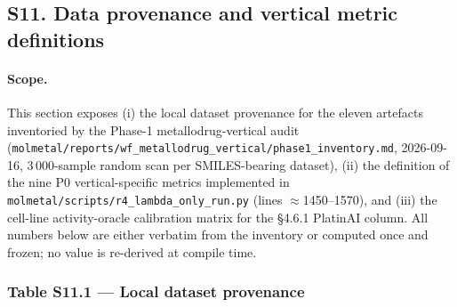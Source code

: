 %
%

\subsection*{S11. Data provenance and vertical metric definitions}
\label{supp:s11-data-provenance}

\paragraph{Scope.}
This section exposes (i) the local dataset provenance for the eleven
artefacts inventoried by the Phase-1 metallodrug-vertical audit
(\texttt{molmetal/reports/wf\_metallodrug\_vertical/phase1\_inventory.md},
2026-09-16, 3\,000-sample random scan per SMILES-bearing dataset), (ii)
the definition of the nine P0 vertical-specific metrics implemented in
\texttt{molmetal/scripts/r4\_lambda\_only\_run.py} (lines
$\approx$1450--1570), and (iii) the cell-line activity-oracle
calibration matrix for the §4.6.1 PlatinAI column.  All numbers below
are either verbatim from the inventory or computed once and frozen; no
value is re-derived at compile time.


\subsubsection*{Table S11.1 --- Local dataset provenance}

